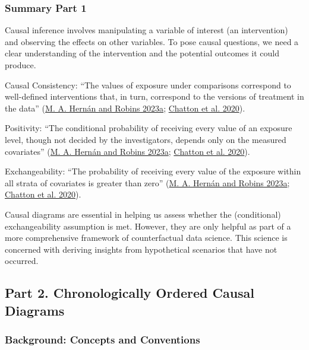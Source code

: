 \documentclass[
  singlecolumn]{article}
\begin{document}
\hypertarget{summary-part-1}{%
\subsubsection{Summary Part 1}\label{summary-part-1}}

Causal inference involves manipulating a variable of interest (an
intervention) and observing the effects on other variables. To pose
causal questions, we need a clear understanding of the intervention and
the potential outcomes it could produce.

Causal Consistency: ``The values of exposure under comparisons
correspond to well-defined interventions that, in turn, correspond to
the versions of treatment in the data''
(\protect\hyperlink{ref-hernuxe1n2023}{M. A. Hernán and Robins 2023a};
\protect\hyperlink{ref-chatton2020}{Chatton et al. 2020}).

Positivity: ``The conditional probability of receiving every value of an
exposure level, though not decided by the investigators, depends only on
the measured covariates'' (\protect\hyperlink{ref-hernuxe1n2023}{M. A.
Hernán and Robins 2023a}; \protect\hyperlink{ref-chatton2020}{Chatton et
al. 2020}).

Exchangeability: ``The probability of receiving every value of the
exposure within all strata of covariates is greater than zero''
(\protect\hyperlink{ref-hernuxe1n2023}{M. A. Hernán and Robins 2023a};
\protect\hyperlink{ref-chatton2020}{Chatton et al. 2020}).

Causal diagrams are essential in helping us assess whether the
(conditional) exchangeability assumption is met. However, they are only
helpful as part of a more comprehensive framework of counterfactual data
science. This science is concerned with deriving insights from
hypothetical scenarios that have not occurred.

\hypertarget{part-2.-chronologically-ordered-causal-diagrams}{%
\subsection{Part 2. Chronologically Ordered Causal
Diagrams}\label{part-2.-chronologically-ordered-causal-diagrams}}

\hypertarget{background-concepts-and-conventions}{%
\subsubsection{Background: Concepts and
Conventions}\label{background-concepts-and-conventions}}
\end{document}

